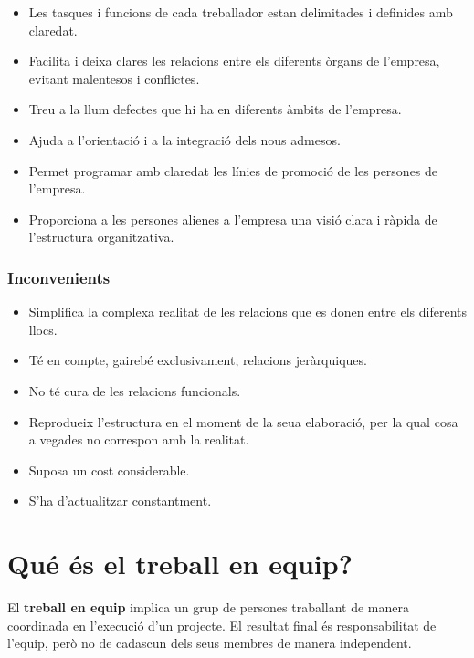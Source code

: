 \documentclass[
]{book}
\providecommand{\tightlist}{%
  \setlength{\itemsep}{0pt}\setlength{\parskip}{0pt}}
\begin{document}
\begin{itemize}
\tightlist
\item
  Les tasques i funcions de cada treballador estan delimitades i definides amb claredat.
\item
  Facilita i deixa clares les relacions entre els diferents òrgans de l'empresa, evitant malentesos i conflictes.
\item
  Treu a la llum defectes que hi ha en diferents àmbits de l'empresa.
\item
  Ajuda a l'orientació i a la integració dels nous admesos.
\item
  Permet programar amb claredat les línies de promoció de les persones de l'empresa.
\item
  Proporciona a les persones alienes a l'empresa una visió clara i ràpida de l'estructura organitzativa.
\end{itemize}

\hypertarget{inconvenients}{%
\subsubsection{Inconvenients}\label{inconvenients}}

\begin{itemize}
\tightlist
\item
  Simplifica la complexa realitat de les relacions que es donen entre els diferents llocs.
\item
  Té en compte, gairebé exclusivament, relacions jeràrquiques.
\item
  No té cura de les relacions funcionals.
\item
  Reprodueix l'estructura en el moment de la seua elaboració, per la qual cosa a vegades no correspon amb la realitat.
\item
  Suposa un cost considerable.
\item
  S'ha d'actualitzar constantment.
\end{itemize}

\hypertarget{quuxe9-uxe9s-el-treball-en-equip}{%
\section{Qué és el treball en equip?}\label{quuxe9-uxe9s-el-treball-en-equip}}

El \textbf{treball en equip} implica un grup de persones traballant de manera coordinada en l'execució d'un projecte. El resultat final és responsabilitat de l'equip, però no de cadascun dels seus membres de manera independent.
\end{document}
